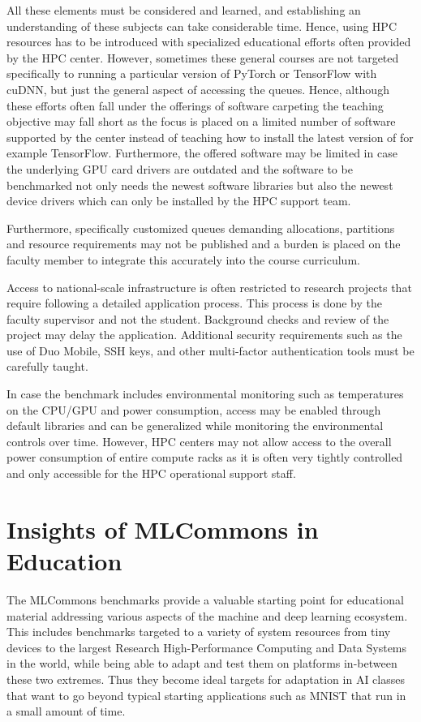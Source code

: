 \documentclass[utf8]{FrontiersinVancouver} %
\begin{document}
{All these elements must be considered and learned, and establishing an
understanding of these subjects can take considerable time. Hence,
using HPC resources has to be introduced with specialized educational
efforts often provided by the HPC center. However, sometimes these
general courses are not targeted specifically to running a particular
version of PyTorch or TensorFlow with cuDNN, but just the general
aspect of accessing the queues. Hence, although these efforts often
fall under the offerings of software carpeting the teaching objective
may fall short as the focus is placed on a limited number of software
supported by the center instead of teaching how to install the latest
version of for example TensorFlow. Furthermore, the offered software
may be limited in case the underlying GPU card drivers are outdated
and the software to be benchmarked not only needs the newest software
libraries but also the newest device drivers which can only be
installed by the HPC support team.

Furthermore, specifically customized queues demanding allocations,
partitions and resource requirements may not be published and a burden
is placed on the faculty member to integrate this accurately into the
course curriculum.

Access to national-scale infrastructure is often restricted to
research projects that require following a detailed application
process. This process is done by the faculty supervisor and not the
student. Background checks and review of the project may delay the
application. Additional security requirements such as the use of Duo
Mobile, SSH keys, and other multi-factor authentication tools must be
carefully taught.

In case the benchmark includes environmental monitoring such as
temperatures on the CPU/GPU and power consumption, access may be
enabled through default libraries and can be generalized while
monitoring the environmental controls over time. However, HPC centers
may not allow access to the overall power consumption of entire
compute racks as it is often very tightly controlled and only
accessible for the HPC operational support staff.

\section{Insights of MLCommons in Education}
\label{sec:edu-mlcommons-insights}

The MLCommons benchmarks provide a valuable starting point for
educational material addressing various aspects of the machine and
deep learning ecosystem. This includes benchmarks targeted to a
variety of system resources from tiny devices to the largest Research
High-Performance Computing and Data Systems in the world, while being
able to adapt and test them on platforms in-between these two
extremes. Thus they become ideal targets for adaptation in AI classes
that want to go beyond typical starting applications such as MNIST
that run in a small amount of time.

}
\end{document}
